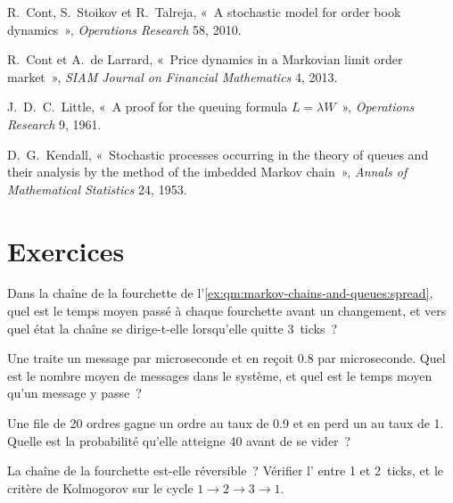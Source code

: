 \begin{omsources}
\item R.~Cont, S.~Stoikov et R.~Talreja, «~A stochastic model for order book dynamics~», \emph{Operations
Research} 58, 2010.
\item R.~Cont et A.~de Larrard, «~Price dynamics in a Markovian limit order market~», \emph{SIAM Journal on
Financial Mathematics} 4, 2013.
\item J.~D.~C.~Little, «~A proof for the queuing formula $L = \lambda W$~», \emph{Operations Research} 9, 1961.
\item D.~G.~Kendall, «~Stochastic processes occurring in the theory of queues and their analysis by the method
of the imbedded Markov chain~», \emph{Annals of Mathematical Statistics} 24, 1953.
\end{omsources}

\section{Exercices}

\begin{exercise}[$\star$]\label{exo:qm:markov-chains-and-queues:1}
Dans la chaîne de la fourchette de l'\cref{ex:qm:markov-chains-and-queues:spread}, quel est le temps moyen passé à chaque fourchette
avant un changement, et vers quel état la chaîne se dirige-t-elle lorsqu'elle quitte 3~ticks~?
\end{exercise}

\begin{exercise}[$\star$]\label{exo:qm:markov-chains-and-queues:2}
Une  traite un message par microseconde et en reçoit 0.8 par microseconde. Quel est le nombre moyen
de messages dans le système, et quel est le temps moyen qu'un message y passe~?
\end{exercise}

\begin{exercise}[$\star$]\label{exo:qm:markov-chains-and-queues:3}
Une file de 20 ordres gagne un ordre au taux de 0.9 et en perd un au taux de 1. Quelle est la probabilité qu'elle atteigne 40 avant
de se vider~?
\end{exercise}

\begin{exercise}[$\star\star$]\label{exo:qm:markov-chains-and-queues:4}
La chaîne de la fourchette est-elle réversible~? Vérifier l' entre 1 et 2~ticks, et le critère de Kolmogorov sur
le cycle $1 \to 2 \to 3 \to 1$.
\end{exercise}

